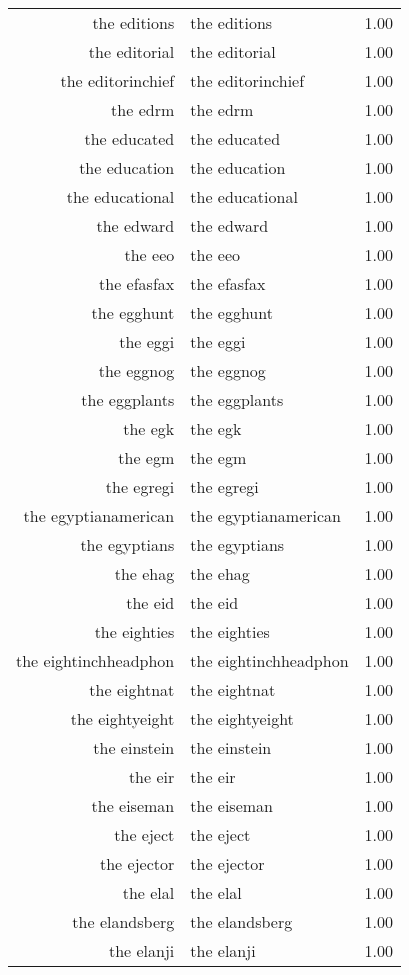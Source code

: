 \begin{table}[ht]
\begin{tabular}{rlr}
  the editions & the editions & 1.00 \\ 
  the editorial & the editorial & 1.00 \\ 
  the editorinchief & the editorinchief & 1.00 \\ 
  the edrm & the edrm & 1.00 \\ 
  the educated & the educated & 1.00 \\ 
  the education & the education & 1.00 \\ 
  the educational & the educational & 1.00 \\ 
  the edward & the edward & 1.00 \\ 
  the eeo & the eeo & 1.00 \\ 
  the efasfax & the efasfax & 1.00 \\ 
  the egghunt & the egghunt & 1.00 \\ 
  the eggi & the eggi & 1.00 \\ 
  the eggnog & the eggnog & 1.00 \\ 
  the eggplants & the eggplants & 1.00 \\ 
  the egk & the egk & 1.00 \\ 
  the egm & the egm & 1.00 \\ 
  the egregi & the egregi & 1.00 \\ 
  the egyptianamerican & the egyptianamerican & 1.00 \\ 
  the egyptians & the egyptians & 1.00 \\ 
  the ehag & the ehag & 1.00 \\ 
  the eid & the eid & 1.00 \\ 
  the eighties & the eighties & 1.00 \\ 
  the eightinchheadphon & the eightinchheadphon & 1.00 \\ 
  the eightnat & the eightnat & 1.00 \\ 
  the eightyeight & the eightyeight & 1.00 \\ 
  the einstein & the einstein & 1.00 \\ 
  the eir & the eir & 1.00 \\ 
  the eiseman & the eiseman & 1.00 \\ 
  the eject & the eject & 1.00 \\ 
  the ejector & the ejector & 1.00 \\ 
  the elal & the elal & 1.00 \\ 
  the elandsberg & the elandsberg & 1.00 \\ 
  the elanji & the elanji & 1.00 \\ 

\end{tabular}
\end{table}
